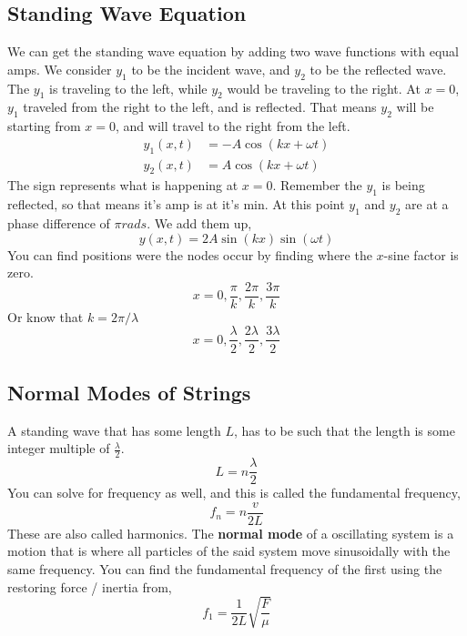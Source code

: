 \subsection{Standing Wave Equation}
We can get the standing wave equation by adding two wave functions with equal amps. We consider $y_1$ to be the incident wave, and $y_2$ to be the reflected wave. The $y_1$ is traveling to the left, while $y_2$ would be traveling to the right. At $x=0$, $y_1$ traveled from the right to the left, and is reflected. That means $y_2$ will be starting from $x=0$, and will travel to the right from the left. 
\begin{align*}
	y_1(x,t) &= -A\cos(kx + \omega t) \\ 
	y_2(x,t) &= A\cos(kx + \omega t)
\end{align*}
The sign represents what is happening at $x=0$. Remember the $y_1$ is being reflected, so that means it's amp is at it's min. At this point $y_1$ and $y_2$ are at a phase difference of $\pi rads$. We add them up,
\begin{equation*}
	y(x,t) = 2A\sin(kx)\sin(\omega t)
\end{equation*}
You can find positions were the nodes occur by finding where the $x$-sine factor is zero. 
\begin{equation*}
	x = 0, \frac{\pi}{k},\frac{2\pi}{k},\frac{3\pi}{k}
\end{equation*}
Or know that $k=2\pi/\lambda$
\begin{equation*}
	x = 0, \frac{\lambda}{2},\frac{2\lambda}{2},\frac{3\lambda}{2}
\end{equation*}

\subsection{Normal Modes of Strings}
A standing wave that has some length $L$, has to be such that the length is some integer multiple of $\frac{\lambda}{2}$.
\begin{equation*}
	L = n\frac{\lambda}{2}
\end{equation*}
You can solve for frequency as well, and this is called the fundamental frequency,
\begin{equation*}
	f_n = n \frac{v}{2L}
\end{equation*}
These are also called harmonics. The \textbf{normal mode} of a oscillating system is a motion that is where all particles of the said system move sinusoidally with the same frequency. You can find the fundamental frequency of the first using the restoring force / inertia from,
\begin{equation*}
	f_1 = \frac{1}{2L}\sqrt{\frac{F}{\mu}}
\end{equation*}